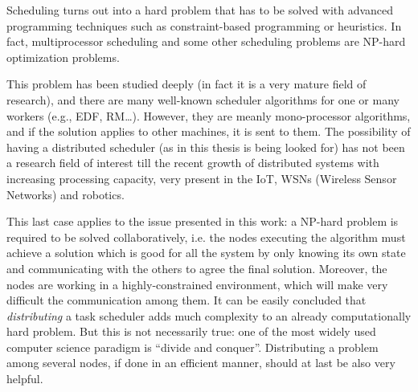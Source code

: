 Scheduling turns out into a hard problem that has to be solved with advanced programming techniques such as constraint-based programming or heuristics. In fact, multiprocessor scheduling and some other scheduling problems are NP-hard optimization problems.


This problem has been studied deeply (in fact it is a very mature field of research), and there are many well-known scheduler algorithms for one or many workers (e.g., EDF, RM…). However, they are meanly mono-processor algorithms, 
and if the solution applies to other machines, it is sent to them. The possibility of having a distributed scheduler (as in this thesis is being looked for) has not been a research field of interest till the recent growth of distributed systems with increasing processing capacity, very present in the IoT, WSNs (Wireless Sensor Networks) and robotics. 

This last case applies to the issue presented in this work: a NP-hard problem is required to be solved collaboratively, i.e. the nodes executing the algorithm must achieve a solution which is good for all the system by only knowing its own state and communicating with the others to agree the final solution. Moreover, the nodes are working in a highly-constrained environment, which will make very difficult the communication among them. It can be easily concluded that \emph{distributing} a task scheduler adds much complexity to an already computationally hard problem. But this is not necessarily true: one of the most widely used computer science paradigm is ``divide and conquer''. Distributing a problem among several nodes, if done in an efficient manner, should at last be also very helpful.

